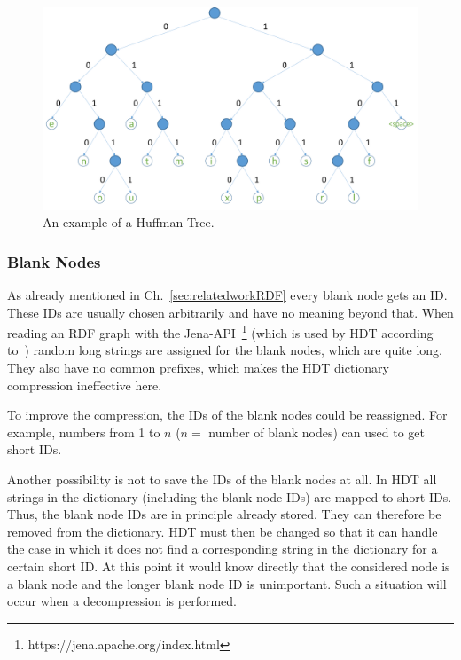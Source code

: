 \begin{figure}
	\centering
	\includegraphics[width=0.9\linewidth]{figures/4_rdf_specific_features/huffman}
	\caption{An example of a Huffman Tree.}
	\label{fig:huffmantree}
\end{figure}

\subsubsection{Blank Nodes}\label{sec:approachBlankNodes}

As already mentioned in Ch.~\ref{sec:relatedworkRDF} every blank node gets an ID. These IDs are usually chosen arbitrarily and have no meaning beyond that. When reading an RDF graph with the Jena-API~\footnote{\label{foot:5}https://jena.apache.org/index.html} (which is used by HDT according to~\cite{hdt}) random long strings are assigned for the blank nodes, which are quite long. They also have no common prefixes, which makes the HDT dictionary compression ineffective here. 

To improve the compression, the IDs of the blank nodes could be reassigned. For example, numbers from 1 to $n$ ($n=$ number of blank nodes) can used to get short IDs. 

Another possibility is not to save the IDs of the blank nodes at all. In HDT all strings in the dictionary (including the blank node IDs) are mapped to short IDs. Thus, the blank node IDs are in principle already stored. They can therefore be removed from the dictionary. HDT must then be changed so that it can handle the case in which it does not find a corresponding string in the dictionary for a certain short ID. At this point it would know directly that the considered node is a blank node and the longer blank node ID is unimportant. Such a situation will occur when a decompression is performed.















